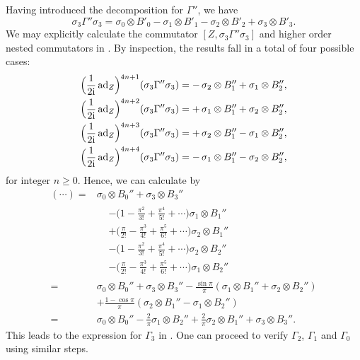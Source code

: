 \documentclass[pra,reprint,superscriptaddress]{revtex4-2}
\begin{document}
Having introduced the decomposition for $\Gamma''$, we have
\begin{equation}
 \sigma_3\Gamma''\sigma_3 = \sigma_0 \otimes B'_0 -\sigma_1 \otimes B'_1
  -\sigma_2 \otimes B'_2 +\sigma_3 \otimes B'_3.
\end{equation}
We may explicitly calculate the commutator $[Z,\sigma_3\Gamma''\sigma_3]$ and higher order nested commutators in . By inspection, the results fall in a total of four possible cases:
\begin{equation}
\begin{aligned}
  \Bigl(\frac{1}{2\mathrm{i}}\operatorname{ad}_Z\Bigr)^{4n+1} (\sigma_3\Gamma''\sigma_3) &= 
 -\, \sigma_2 \otimes B_1'' + \sigma_1\otimes B''_2,\\
   \Bigl(\frac{1}{2\mathrm{i}}\operatorname{ad}_Z\Bigr)^{4n+2} (\sigma_3\Gamma''\sigma_3) &= 
 +\,\sigma_1 \otimes B_1'' + \sigma_2\otimes B''_2,\\
  \Bigl(\frac{1}{2\mathrm{i}}\operatorname{ad}_Z\Bigr)^{4n+3} (\sigma_3\Gamma''\sigma_3) &= 
 +\,\sigma_2 \otimes B_1'' - \sigma_1\otimes B''_2,\\
  \Bigl(\frac{1}{2\mathrm{i}}\operatorname{ad}_Z\Bigr)^{4n+4} (\sigma_3\Gamma''\sigma_3) &= 
 -\, \sigma_1 \otimes B_1'' - \sigma_2\otimes B''_2,\\
\end{aligned}
\end{equation}
for integer $n\ge0$. Hence, we can calculate  by 
\begin{equation}
\begin{aligned}
  (\cdots)={} &\sigma_0 \otimes B_0'' + \sigma_3 \otimes B_3''\\
 &\begin{aligned}
  &-\bigl(1-\frac{\pi^2}{3!}+\frac{\pi^4}{5!}+\cdots\bigr) \sigma_1 \otimes B_1''\\
  &+\bigl(\frac{\pi}{2!}-\frac{\pi^3}{4!}+\frac{\pi^5}{6!}+\cdots\bigr) \sigma_2 \otimes B_1''\\
  &-\bigl(1-\frac{\pi^2}{3!}+\frac{\pi^4}{5!}+\cdots\bigr) \sigma_2 \otimes B_2''\\
  &-\bigl(\frac{\pi}{2!}-\frac{\pi^3}{4!}+\frac{\pi^5}{6!}+\cdots\bigr)\sigma_1 \otimes B_2''
 \end{aligned}\\
 ={} & \sigma_0 \otimes B_0'' + \sigma_3 \otimes B_3''-\frac{\sin\pi}{\pi} (\sigma_1 \otimes B_1'' + \sigma_2 \otimes B_2'')\\
&+\frac{1-\cos\pi}{\pi} (\sigma_2 \otimes B_1'' - \sigma_1 \otimes B_2'')\\
={}&\sigma_0 \otimes B_0'' 
-\frac{2}{\pi}  \sigma_1 \otimes B_2''
+\frac{2}{\pi} \sigma_2 \otimes B_1'' + \sigma_3 \otimes B_3''.
\end{aligned}
\end{equation}
This leads to the expression for $\Gamma_3$ in .
One can proceed to verify $\Gamma_2$, $\Gamma_1$ and $\Gamma_0$ using similar steps. 
\end{document}
